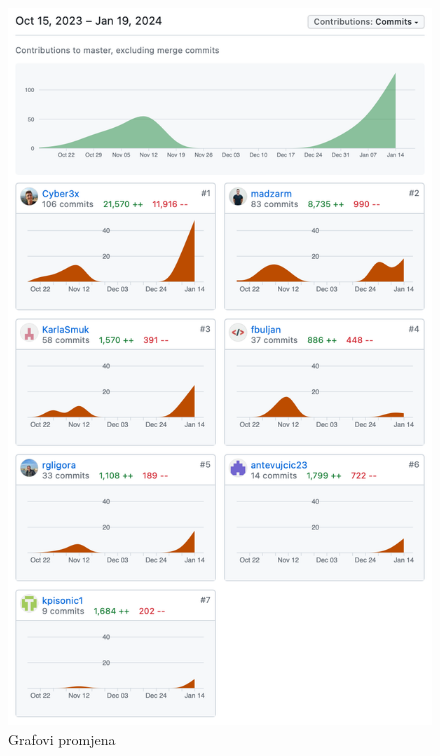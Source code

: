 		\begin{figure}[H]
			\includegraphics[scale=0.7]{slike/commits.png}
			\centering
			\caption{Grafovi promjena}
			\label{fig:commits}
		\end{figure}
		
		
	
